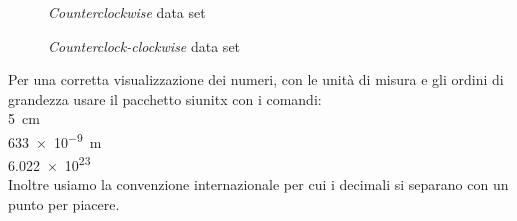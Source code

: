 \documentclass[a4paper,11pt]{article}
\begin{document}
	
	\begin{figure}
		\centering
		\caption{\emph{Counterclockwise} data set}
		\label{fig:counterclockwiseplot}
	\end{figure}
	
	\begin{figure}
		\centering
		\caption{\emph{Counterclock-clockwise} data set}
		\label{fig:clock-anticlockplot}
	\end{figure}
	
	Per una corretta visualizzazione dei numeri, con le unità di misura e gli ordini di grandezza usare il pacchetto siunitx con i comandi:\\
	
		\SI{5}{\centi\meter}
	\\
		\SI{633e-9}{\meter}
	\\
		\num{6.022e23}
	\\
	Inoltre usiamo la convenzione internazionale per cui i decimali si separano con un punto per piacere.
	

	
\end{document}
